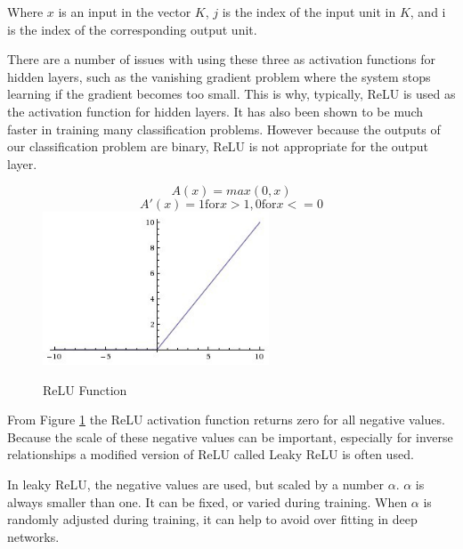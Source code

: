 Where $x$ is an input in the vector $K$,  $j$ is the index of the input unit in $K$, and i is the index of the corresponding output unit. 

There are a number of issues with using these three as activation functions for hidden layers, such as the vanishing gradient problem\cite{LeCun_backprop} where the system stops learning if the gradient becomes too small. This is why, typically, ReLU is used as the activation function for hidden layers. It has also been shown\cite{Krizhevsky_neural} to be much faster in training many classification problems. However because the outputs of our classification problem are binary, ReLU is not appropriate for the output layer\cite{Rumelhart_error_propagation}.

\begin{figure}[H]
\caption{ReLU Function}
\label{fig:ReLU}
\centering
\begin{equation}
A(x)=max(0,x)
\end{equation}
\begin{equation}
A'(x)=1 \text{for} x>1, 0 \text{for} x<=0
\end{equation}
\includegraphics[width=0.6\textwidth]{Figures/ReLU.jpg}
\end{figure}

From Figure \ref{fig:ReLU} the ReLU activation function returns zero for all negative values. Because the scale of these negative values can be important, especially for inverse relationships\cite{LeCun_backprop} a modified version of ReLU called Leaky ReLU is often used.

In leaky ReLU, the negative values are used, but scaled by a number $\alpha$. $\alpha$ is always smaller than one. It can be fixed, or varied during training. When $\alpha$ is randomly adjusted during training, it can help to avoid over fitting in deep networks\cite{fast_learning}.

